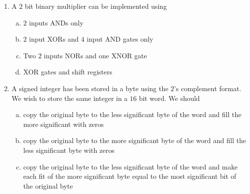 \documentclass[journal,12pt,twocolumn]{IEEEtran}
\begin{document}
\begin{enumerate}
\begin{enumerate}[(a)]
\end{enumerate}






\item A $2$ bit binary multiplier can be implemented using

\begin{enumerate}[(a)]
 
\item $2$ inputs ANDs only

\item $2$ input XORs and $4$ input AND gates only

\item Two $2$ inputs NORs and one XNOR gate

\item XOR gates and shift registers


\end{enumerate}

\item A signed integer has been stored in a byte using the $2$'s complement format. We wish to store the same integer in a $16$ bit word. We should
\begin{enumerate}[(a)]
 
\item copy the original byte to the less significant byte of the word and fill the more significant with zeros

\item copy the original byte to the more significant byte of the word and fill the less significant byte with zeros

\item copy the original byte to the less significant byte of the word and make each fit of the more significant byte equal to the most significant bit of the original byte


\end{enumerate}
\end{enumerate}
\end{document}
